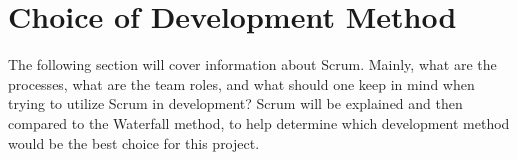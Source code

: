 \section{Choice of Development Method}

The following section will cover information about Scrum. Mainly, what are the 
processes, what are the team roles, and what should one keep in mind when 
trying to utilize Scrum in development? Scrum will be explained and then compared 
to the Waterfall method, to help determine which development method would be the
best choice for this project.





